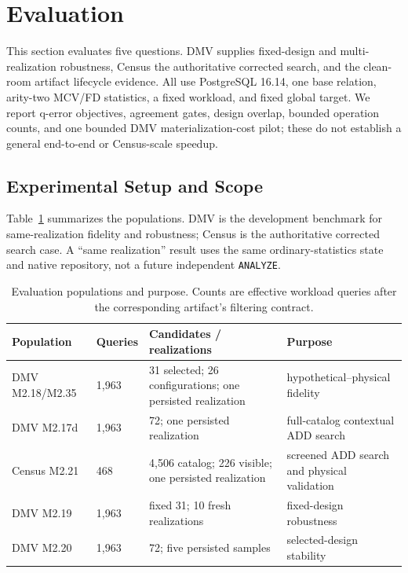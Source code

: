\section{Evaluation}\label{sec:evaluation}

This section evaluates five questions.  DMV supplies fixed-design and
multi-realization robustness, Census the authoritative corrected search, and
the clean-room artifact lifecycle evidence.  All use PostgreSQL 16.14, one
base relation, arity-two MCV/FD statistics, a fixed workload, and fixed global
target.  We report q-error objectives, agreement gates, design overlap, bounded
operation counts, and one bounded DMV materialization-cost pilot; these do not
establish a general end-to-end or Census-scale speedup.

\subsection{Experimental Setup and Scope}

Table~\ref{tab:eval-setup} summarizes the populations.  DMV is the
development benchmark for same-realization fidelity and robustness; Census is
the authoritative corrected search case.  A ``same realization'' result uses
the same ordinary-statistics state and native repository, not a future
independent \texttt{ANALYZE}.

\begin{table}[t]
\caption{Evaluation populations and purpose. Counts are effective workload
queries after the corresponding artifact's filtering contract.}
\label{tab:eval-setup}
\scriptsize
\begin{tabular}{@{}p{}p{}p{}p{}@{}}
\toprule
Population & Queries & Candidates / realizations & Purpose \\
\midrule
DMV M2.18/M2.35 & 1,963 & 31 selected; 26 configurations; one persisted realization & hypothetical--physical fidelity \\
DMV M2.17d & 1,963 & 72; one persisted realization & full-catalog contextual ADD search \\
Census M2.21 & 468 & 4,506 catalog; 226 visible; one persisted realization & screened ADD search and physical validation \\
DMV M2.19 & 1,963 & fixed 31; 10 fresh realizations & fixed-design robustness \\
DMV M2.20 & 1,963 & 72; five persisted samples & selected-design stability \\
\bottomrule
\end{tabular}
\end{table}

